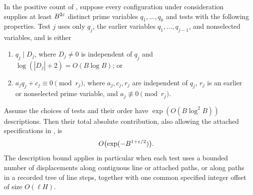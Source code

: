\begin{lemma}\label{lem:triangular-saving}
In the positive count of , suppose every
configuration under consideration supplies at least $B^{2\varepsilon}$
distinct prime variables $q_1,\ldots,q_k$ and tests with the following
properties.  Test $j$ uses only $q_j$, the earlier variables
$q_1,\ldots,q_{j-1}$, and nonselected variables, and is either
\begin{enumerate}
\item $q_j\mid D_j$, where $D_j\ne0$ is independent of $q_j$ and
$\log(|D_j|+2)=O(B\log B)$; or
\item $a_jq_j+c_j\equiv0\pmod{r_j}$, where $a_j,c_j,r_j$ are
independent of $q_j$, $r_j$ is an earlier or nonselected prime
variable, and $a_j\not\equiv0\pmod{r_j}$.
\end{enumerate}
Assume the choices of tests and their order have
$\exp(O(B\log^2B))$ descriptions.  Then their total absolute
contribution, also allowing the attached specifications in
, is
\begin{equation}\label{eq:negligible-constraints}
 O\bigl(\exp(-B^{1+\varepsilon/2})\bigr).
\end{equation}
The description bound applies in particular when each test uses a
bounded number of displacements along contiguous line or attached
paths, or along paths in a recorded tree of line steps, together with
one common specified integer offset of size $O(\ell H)$.
\end{lemma}

